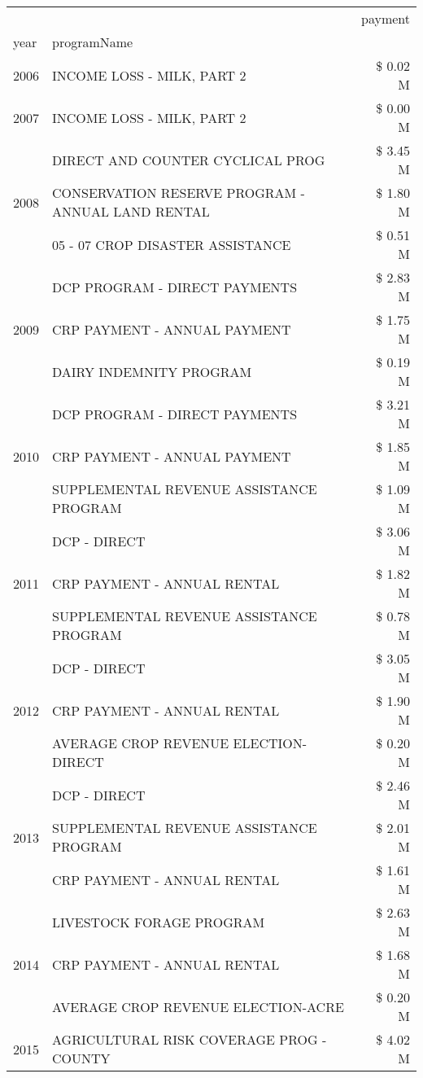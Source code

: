 \begin{tabular}{llr}
\toprule
 &  & payment \\
year & programName &  \\
\midrule
2006 & INCOME LOSS - MILK, PART 2 & \$ 0.02 M \\
\cline{1-3}
2007 & INCOME LOSS - MILK, PART 2 & \$ 0.00 M \\
\cline{1-3}
\multirow[t]{3}{*}{2008} & DIRECT AND COUNTER CYCLICAL PROG & \$ 3.45 M \\
 & CONSERVATION RESERVE PROGRAM - ANNUAL LAND RENTAL & \$ 1.80 M \\
 & 05 - 07 CROP DISASTER ASSISTANCE & \$ 0.51 M \\
\cline{1-3}
\multirow[t]{3}{*}{2009} & DCP PROGRAM - DIRECT PAYMENTS & \$ 2.83 M \\
 & CRP PAYMENT - ANNUAL PAYMENT & \$ 1.75 M \\
 & DAIRY INDEMNITY PROGRAM & \$ 0.19 M \\
\cline{1-3}
\multirow[t]{3}{*}{2010} & DCP PROGRAM - DIRECT PAYMENTS & \$ 3.21 M \\
 & CRP PAYMENT - ANNUAL PAYMENT & \$ 1.85 M \\
 & SUPPLEMENTAL REVENUE ASSISTANCE PROGRAM & \$ 1.09 M \\
\cline{1-3}
\multirow[t]{3}{*}{2011} & DCP - DIRECT & \$ 3.06 M \\
 & CRP PAYMENT - ANNUAL RENTAL & \$ 1.82 M \\
 & SUPPLEMENTAL REVENUE ASSISTANCE PROGRAM & \$ 0.78 M \\
\cline{1-3}
\multirow[t]{3}{*}{2012} & DCP - DIRECT & \$ 3.05 M \\
 & CRP PAYMENT - ANNUAL RENTAL & \$ 1.90 M \\
 & AVERAGE CROP REVENUE ELECTION-DIRECT & \$ 0.20 M \\
\cline{1-3}
\multirow[t]{3}{*}{2013} & DCP - DIRECT & \$ 2.46 M \\
 & SUPPLEMENTAL REVENUE ASSISTANCE PROGRAM & \$ 2.01 M \\
 & CRP PAYMENT - ANNUAL RENTAL & \$ 1.61 M \\
\cline{1-3}
\multirow[t]{3}{*}{2014} & LIVESTOCK FORAGE PROGRAM & \$ 2.63 M \\
 & CRP PAYMENT - ANNUAL RENTAL & \$ 1.68 M \\
 & AVERAGE CROP REVENUE ELECTION-ACRE & \$ 0.20 M \\
\cline{1-3}
\multirow[t]{3}{*}{2015} & AGRICULTURAL RISK COVERAGE PROG - COUNTY & \$ 4.02 M \\

\end{tabular}
